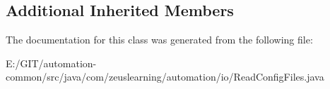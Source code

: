 \subsection*{Additional Inherited Members}


The documentation for this class was generated from the following file\+:\begin{DoxyCompactItemize}
\item 
E\+:/\+G\+I\+T/automation-\/common/src/java/com/zeuslearning/automation/io/Read\+Config\+Files.\+java\end{DoxyCompactItemize}
